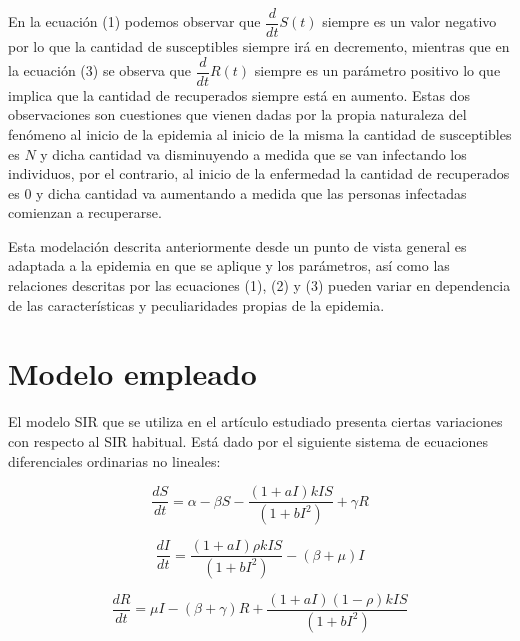 \documentclass{article}
\begin{document}
En la ecuación (1) podemos observar que $\dfrac{d}{dt}S(t)$ siempre es un valor negativo por lo que la cantidad de susceptibles siempre irá en decremento, mientras que en la ecuación (3) se observa que $\dfrac{d}{dt}R(t)$ siempre es un parámetro positivo lo que implica que la cantidad de recuperados siempre está en aumento. Estas dos observaciones son cuestiones que vienen dadas por la propia naturaleza del fenómeno al inicio de la epidemia al inicio de la misma la cantidad de susceptibles es $N$ y dicha cantidad va disminuyendo a medida que se van infectando los individuos, por el contrario, al inicio de la enfermedad la cantidad de recuperados es 0 y dicha cantidad va aumentando a medida que las personas infectadas comienzan a recuperarse.

Esta modelación descrita anteriormente desde un punto de vista general es
adaptada a la epidemia en que se aplique y los parámetros, así como las relaciones descritas por las ecuaciones (1), (2) y (3) pueden variar en dependencia de las características y peculiaridades propias de la epidemia.    


\section{Modelo empleado}

El modelo SIR que se utiliza en el art\'iculo estudiado presenta ciertas variaciones con respecto al SIR habitual. Est\'a dado por el siguiente sistema de ecuaciones diferenciales ordinarias no lineales:

\begin{equation}
    \dfrac{dS}{dt}= \alpha - \beta S - \dfrac{(1+aI)kIS}{(1+bI^2)} + \gamma R
\end{equation}

\begin{equation}
    \dfrac{dI}{dt}= \dfrac{(1+aI)\rho kIS}{(1+bI^2)} - (\beta + \mu)I
\end{equation}

\begin{equation}
    \dfrac{dR}{dt}= \mu I - (\beta + \gamma)R + \dfrac{(1+aI)(1-\rho)kIS}{(1+bI^2)}
\end{equation}
\end{document}
